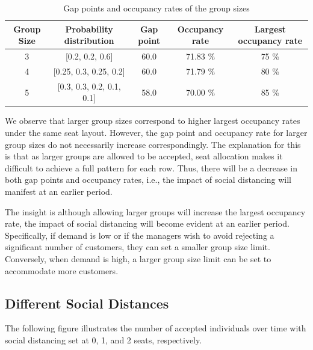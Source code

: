 
\begin{table}[ht]
  \centering
  \caption{Gap points and occupancy rates of the group sizes}
  \begin{tabular}{|c|c|c|c|c|}
  \hline
   Group Size & Probability distribution & Gap point & Occupancy rate & Largest occupancy rate \\
  \hline
   3 & [0.2, 0.2, 0.6] & 60.0  & 71.83 \% & 75 \% \\
   4 & [0.25, 0.3, 0.25, 0.2] & 60.0 & 71.79 \% & 80 \%  \\ 
   5 & [0.3, 0.3, 0.2, 0.1, 0.1] & 58.0 & 70.00 \% & 85 \% \\
   \hline
  \end{tabular}
\end{table}

We observe that larger group sizes correspond to higher largest occupancy rates under the same seat layout. However, the gap point and occupancy rate for larger group sizes do not necessarily increase correspondingly. The explanation for this is that as larger groups are allowed to be accepted, seat allocation makes it difficult to achieve a full pattern for each row. Thus, there will be a decrease in both gap points and occupancy rates, i.e., the impact of social distancing will manifest at an earlier period.

The insight is although allowing larger groups will increase the largest occupancy rate, the impact of social distancing will become evident at an earlier period. Specifically, if demand is low or if the managers wish to avoid rejecting a significant number of customers, they can set a smaller group size limit. Conversely, when demand is high, a larger group size limit can be set to accommodate more customers.

\subsection*{Different Social Distances}
The following figure illustrates the number of accepted individuals over time with social distancing set at 0, 1, and 2 seats, respectively.

